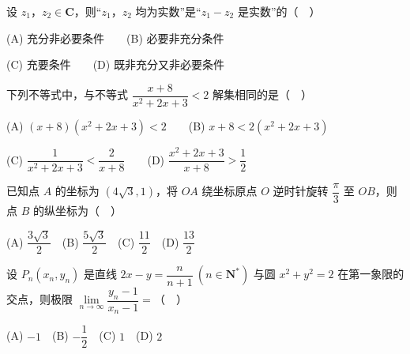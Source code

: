\begin{question}
设 \(z_{1}\)，\(z_{2}\in\mathbf{C}\)，则“\(z_{1}\)，\(z_{2}\) 均为实数”是“\(z_{1}-z_{2}\) 是实数”的（　）

(A) 充分非必要条件　　(B) 必要非充分条件

(C) 充要条件　　(D) 既非充分又非必要条件

\end{question}
\begin{question}
下列不等式中，与不等式 \(\dfrac{x+8}{x^{2}+2x+3}<2\) 解集相同的是（　）

(A) \((x+8)(x^{2}+2x+3)<2\)　　(B) \(x+8<2(x^{2}+2x+3)\)

(C) \(\dfrac{1}{x^{2}+2x+3}<\dfrac{2}{x+8}\)　　(D) \(\dfrac{x^{2}+2x+3}{x+8}>\dfrac{1}{2}\)

\end{question}
\begin{question}
已知点 \(A\) 的坐标为 \((4\sqrt{3},1)\)，将 \(OA\) 绕坐标原点 \(O\) 逆时针旋转 \(\dfrac{\pi}{3}\) 至 \(OB\)，则点 \(B\) 的纵坐标为（　）

(A) \(\dfrac{3\sqrt{3}}{2}\)　(B) \(\dfrac{5\sqrt{3}}{2}\)　(C) \(\dfrac{11}{2}\)　(D) \(\dfrac{13}{2}\)

\end{question}
\begin{question}
设 \(P_{n}(x_{n},y_{n})\) 是直线 \(2x-y=\dfrac{n}{n+1}\ (n\in\mathbf{N}^{*})\) 与圆 \(x^{2}+y^{2}=2\) 在第一象限的交点，则极限 \(\lim\limits_{n\to\infty}\dfrac{y_{n}-1}{x_{n}-1}=\)（　）

(A) \(-1\)　(B) \(-\dfrac{1}{2}\)　(C) \(1\)　(D) \(2\)

\end{question}

